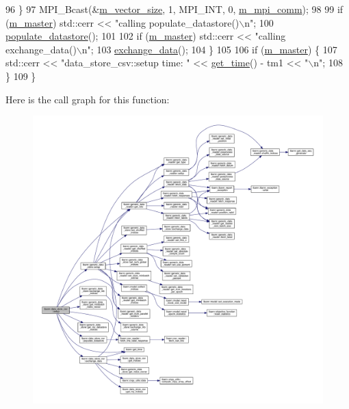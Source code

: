 \begin{DoxyCode}
96     \}
97     MPI\_Bcast(&\hyperlink{classlbann_1_1data__store__csv_acf75e96923877e10c8ed499ec48f9320}{m\_vector\_size}, 1, MPI\_INT, 0, \hyperlink{classlbann_1_1generic__data__store_ae2d2d61d5d766a7f525eedcb05e0dbf6}{m\_mpi\_comm});
98 
99     \textcolor{keywordflow}{if} (\hyperlink{classlbann_1_1generic__data__store_a143fd33ef3a53180bc62745e369c16f8}{m\_master}) std::cerr << \textcolor{stringliteral}{"calling populate\_datastore()\(\backslash\)n"};
100     \hyperlink{classlbann_1_1data__store__csv_a6184c48ec096372899e127235bb741da}{populate\_datastore}(); 
101 
102     \textcolor{keywordflow}{if} (\hyperlink{classlbann_1_1generic__data__store_a143fd33ef3a53180bc62745e369c16f8}{m\_master}) std::cerr << \textcolor{stringliteral}{"calling exchange\_data()\(\backslash\)n"};
103     \hyperlink{classlbann_1_1data__store__csv_acacd039d3ca8caf8958b731a1ce382c6}{exchange\_data}();
104   \}
105 
106   \textcolor{keywordflow}{if} (\hyperlink{classlbann_1_1generic__data__store_a143fd33ef3a53180bc62745e369c16f8}{m\_master}) \{
107     std::cerr << \textcolor{stringliteral}{"data\_store\_csv::setup time: "} << \hyperlink{namespacelbann_a478d36031ff0659893c4322cd856157f}{get\_time}() - tm1 << \textcolor{stringliteral}{"\(\backslash\)n"};
108   \}
109 \}
\end{DoxyCode}
Here is the call graph for this function\+:\nopagebreak
\begin{figure}[H]
\begin{center}
\leavevmode
\includegraphics[width=350pt]{classlbann_1_1data__store__csv_a184c7e6f27c5e07255b9c889ace02407_cgraph}
\end{center}
\end{figure}
